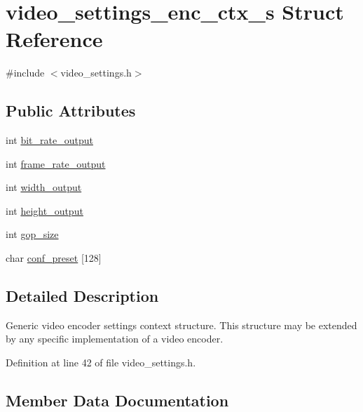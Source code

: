 \hypertarget{structvideo__settings__enc__ctx__s}{}\section{video\+\_\+settings\+\_\+enc\+\_\+ctx\+\_\+s Struct Reference}
\label{structvideo__settings__enc__ctx__s}


{\ttfamily \#include $<$video\+\_\+settings.\+h$>$}

\subsection*{Public Attributes}
\begin{DoxyCompactItemize}
\item 
int \hyperlink{structvideo__settings__enc__ctx__s_a050b9b94d11483b88515d3c5ad524df4}{bit\+\_\+rate\+\_\+output}
\item 
int \hyperlink{structvideo__settings__enc__ctx__s_a374976580e00d9b0a51ea5a87e367a27}{frame\+\_\+rate\+\_\+output}
\item 
int \hyperlink{structvideo__settings__enc__ctx__s_ab4ee3d991f865c4aa78016a720b50642}{width\+\_\+output}
\item 
int \hyperlink{structvideo__settings__enc__ctx__s_ac6b5478817ecb36b1b5211d7c9232cff}{height\+\_\+output}
\item 
int \hyperlink{structvideo__settings__enc__ctx__s_a9b995fd8437d3c4bd471ef2891b14c64}{gop\+\_\+size}
\item 
char \hyperlink{structvideo__settings__enc__ctx__s_ac1eb98f4a736449a6b706fd0de013209}{conf\+\_\+preset} \mbox{[}128\mbox{]}
\end{DoxyCompactItemize}


\subsection{Detailed Description}
Generic video encoder settings context structure. This structure may be extended by any specific implementation of a video encoder. 

Definition at line 42 of file video\+\_\+settings.\+h.



\subsection{Member Data Documentation}
